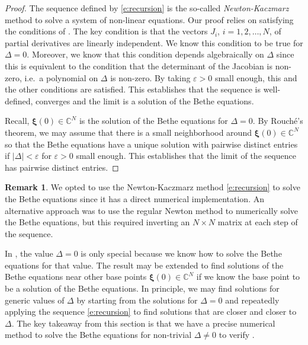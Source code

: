 \documentclass[a4paper,11pt]{article}
\theoremstyle{definition}
\newtheorem{remark}[theorem]{Remark}
\begin{document}
\begin{proof}
The sequence defined by \eqref{e:recursion} is the so-called \emph{Newton-Kaczmarz} method to solve a system of non-linear equations. Our proof relies on satisfying the conditions of \cite[Theorem 2.1]{martinez1986method}. The key condition is that the vectors $J_i$, $i= 1, 2, \dots, N$, of partial derivatives are linearly independent. We know this condition to be true for $\Delta = 0$. Moreover, we know that this condition depends algebraically on $\Delta$ since this is equivalent to the condition that the determinant of the Jacobian is non-zero, i.e.~a polynomial on $\Delta$ is non-zero. By taking $\varepsilon >0$ small enough, this and the other conditions are satisfied. This establishes that the sequence is well-defined, converges and the limit is a solution of the Bethe equations.   

Recall, $\boldsymbol{\xi}(0) \in \mathbb{C}^N$ is the solution of the Bethe equations for $\Delta =0$. By Rouch\'e's theorem, we may assume that there is a small neighborhood around $\boldsymbol{\xi}(0) \in \mathbb{C}^N$ so that the Bethe equations have a unique solution with pairwise distinct entries if $|\Delta| < \varepsilon$ for $\varepsilon >0$ small enough. This establishes that the limit of the sequence has pairwise distinct entries.
\end{proof}

\begin{remark}
    We opted to use the Newton-Kaczmarz method \eqref{e:recursion} to solve the Bethe equations since it has a direct numerical implementation. An alternative approach was to use the regular Newton method to numerically solve the Bethe equations, but this required inverting an $N\times N$ matrix at each step of the sequence. 
\end{remark}

In , the value $\Delta = 0$ is only special because we know how to solve the Bethe equations for that value. The result may be extended to find solutions of the Bethe equations near other base points $\boldsymbol{\xi}(0) \in \mathbb{C}^N$ if we know the base point to be a solution of the Bethe equations. In principle, we may find solutions for generic values of $\Delta$ by starting from the solutions for $\Delta =0$ and repeatedly applying the sequence \eqref{e:recursion} to find solutions that are closer and closer to $\Delta$. The key takeaway from this section is that we have a precise numerical method to solve the Bethe equations for non-trivial $\Delta \neq 0$ to verify .
\end{document}
